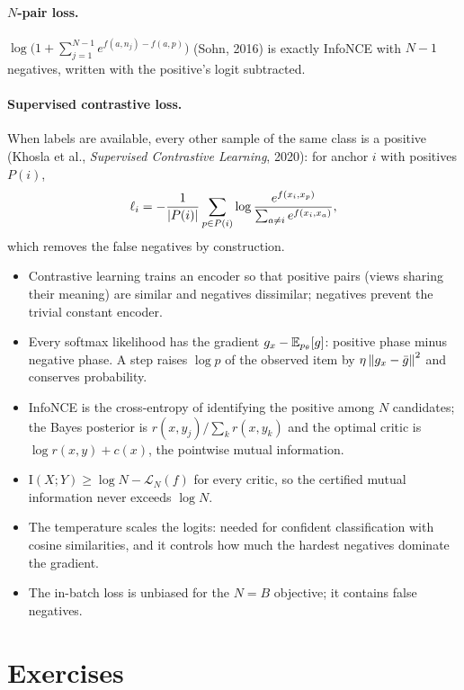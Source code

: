\begin{notechapter}
\paragraph{$N$-pair loss.} $\log\bigl(1 + \sum_{j=1}^{N-1}e^{f(a, n_j) - f(a, p)}\bigr)$ (Sohn, 2016) is exactly InfoNCE with $N - 1$ negatives, written with the
positive's logit subtracted.

\paragraph{Supervised contrastive loss.} When labels are available, every other sample of the same
class is a positive (Khosla et al., \emph{Supervised Contrastive Learning}, 2020): for anchor $i$ with
positives $P(i)$,
\[
  \ell_i = -\frac1{\left|P(i)\right|}\sum_{p\in P(i)}\log\frac{e^{f(x_i, x_p)}}{\sum_{a\neq i}e^{f(x_i, x_a)}},
\]
which removes the false negatives by construction.

\begin{chaptersummary}
\begin{itemize}
  \item Contrastive learning trains an encoder so that positive pairs (views sharing their meaning)
        are similar and negatives dissimilar; negatives prevent the trivial constant encoder.
  \item Every softmax likelihood has the gradient $g_x - \mathbb{E}_{p_\theta}[g]$: positive phase minus negative phase.
        A step raises $\log p$ of the observed item by $\eta\left\|g_x - \bar g\right\|^2$ and conserves probability.
  \item InfoNCE is the cross-entropy of identifying the positive among $N$ candidates; the Bayes
        posterior is $r(x, y_j)/\sum_kr(x, y_k)$ and the optimal critic is $\log r(x, y) + c(x)$, the pointwise mutual information.
  \item $\mathrm I(X; Y)\geq\log N - \mathcal L_N(f)$ for every critic, so the certified mutual information never exceeds $\log N$.
  \item The temperature scales the logits: needed for confident classification with cosine
        similarities, and it controls how much the hardest negatives dominate the gradient.
  \item The in-batch loss is unbiased for the $N = B$ objective; it contains false negatives.
\end{itemize}
\end{chaptersummary}

\section*{Exercises}


\end{notechapter}
